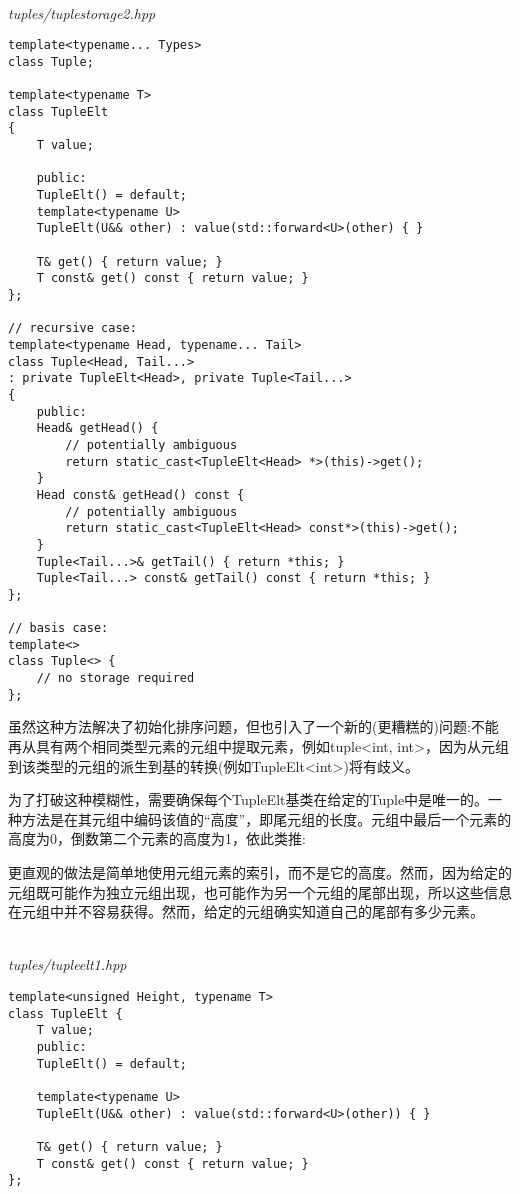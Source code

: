 \hspace*{\fill} \\ %
\noindent
\textit{tuples/tuplestorage2.hpp}
\begin{lstlisting}[style=styleCXX]
template<typename... Types>
class Tuple;

template<typename T>
class TupleElt
{
	T value;
	
	public:
	TupleElt() = default;
	template<typename U>
	TupleElt(U&& other) : value(std::forward<U>(other) { }
	
	T& get() { return value; }
	T const& get() const { return value; }
};

// recursive case:
template<typename Head, typename... Tail>
class Tuple<Head, Tail...>
: private TupleElt<Head>, private Tuple<Tail...>
{
	public:
	Head& getHead() {
		// potentially ambiguous
		return static_cast<TupleElt<Head> *>(this)->get();
	}
	Head const& getHead() const {
		// potentially ambiguous
		return static_cast<TupleElt<Head> const*>(this)->get();
	}
	Tuple<Tail...>& getTail() { return *this; }
	Tuple<Tail...> const& getTail() const { return *this; }
};

// basis case:
template<>
class Tuple<> {
	// no storage required
};
\end{lstlisting}

虽然这种方法解决了初始化排序问题，但也引入了一个新的(更糟糕的)问题:不能再从具有两个相同类型元素的元组中提取元素，例如tuple<int, int>，因为从元组到该类型的元组的派生到基的转换(例如TupleElt<int>)将有歧义。

为了打破这种模糊性，需要确保每个TupleElt基类在给定的Tuple中是唯一的。一种方法是在其元组中编码该值的“高度”，即尾元组的长度。元组中最后一个元素的高度为0，倒数第二个元素的高度为1，依此类推:

\begin{tcolorbox}[colback=webgreen!5!white,colframe=webgreen!75!black]
\hspace*{0.75cm}更直观的做法是简单地使用元组元素的索引，而不是它的高度。然而，因为给定的元组既可能作为独立元组出现，也可能作为另一个元组的尾部出现，所以这些信息在元组中并不容易获得。然而，给定的元组确实知道自己的尾部有多少元素。
\end{tcolorbox}

\hspace*{\fill} \\ %
\noindent
\textit{tuples/tupleelt1.hpp}
\begin{lstlisting}[style=styleCXX]
template<unsigned Height, typename T>
class TupleElt {
	T value;
	public:
	TupleElt() = default;
	
	template<typename U>
	TupleElt(U&& other) : value(std::forward<U>(other)) { }
	
	T& get() { return value; }
	T const& get() const { return value; }
};
\end{lstlisting}

